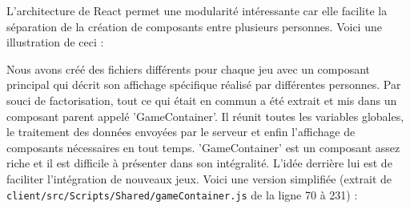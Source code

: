 \documentclass[a4paper]{article}
\begin{document}
L'architecture de React permet une modularité intéressante car elle facilite la séparation de la création de composants entre plusieurs personnes. Voici une illustration de ceci :

Nous avons créé des fichiers différents pour chaque jeu avec un composant principal qui décrit son affichage spécifique réalisé par différentes personnes. Par souci de factorisation, tout ce qui était en commun a été extrait et mis dans un composant parent appelé 'GameContainer'. Il réunit toutes les variables globales, le traitement des données envoyées par le serveur et enfin l'affichage de composants nécessaires en tout temps. 'GameContainer' est un composant assez riche et il est difficile à présenter dans son intégralité. L'idée derrière lui est de faciliter l'intégration de nouveaux jeux. Voici une version simplifiée (extrait de \texttt{client/src/Scripts/Shared/gameContainer.js} de la ligne 70 à 231) :
\end{document}
